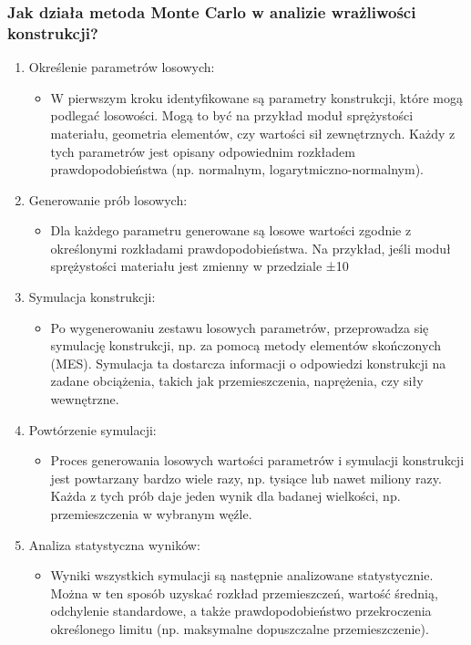 \subsubsection*{Jak działa metoda Monte Carlo w analizie wrażliwości konstrukcji?}
\begin{enumerate}
\item Określenie parametrów losowych:

\begin{itemize}
\item W pierwszym kroku identyfikowane są parametry konstrukcji, które mogą podlegać losowości. Mogą to być na przykład moduł sprężystości materiału, geometria elementów, czy wartości sił zewnętrznych. Każdy z tych parametrów jest opisany odpowiednim rozkładem prawdopodobieństwa (np. normalnym, logarytmiczno-normalnym).
\end{itemize}

\item Generowanie prób losowych:

\begin{itemize}
\item Dla każdego parametru generowane są losowe wartości zgodnie z określonymi rozkładami prawdopodobieństwa. Na przykład, jeśli moduł sprężystości materiału jest zmienny w przedziale ±10%
\end{itemize}

\item Symulacja konstrukcji:

\begin{itemize}
\item Po wygenerowaniu zestawu losowych parametrów, przeprowadza się symulację konstrukcji, np. za pomocą metody elementów skończonych (MES). Symulacja ta dostarcza informacji o odpowiedzi konstrukcji na zadane obciążenia, takich jak przemieszczenia, naprężenia, czy siły wewnętrzne.
\end{itemize}

\item Powtórzenie symulacji:

\begin{itemize}
\item Proces generowania losowych wartości parametrów i symulacji konstrukcji jest powtarzany bardzo wiele razy, np. tysiące lub nawet miliony razy. Każda z tych prób daje jeden wynik dla badanej wielkości, np. przemieszczenia w wybranym węźle.
\end{itemize}

\item Analiza statystyczna wyników:

\begin{itemize}
\item Wyniki wszystkich symulacji są następnie analizowane statystycznie. Można w ten sposób uzyskać rozkład przemieszczeń, wartość średnią, odchylenie standardowe, a także prawdopodobieństwo przekroczenia określonego limitu (np. maksymalne dopuszczalne przemieszczenie).
\end{itemize}

\end{enumerate}
